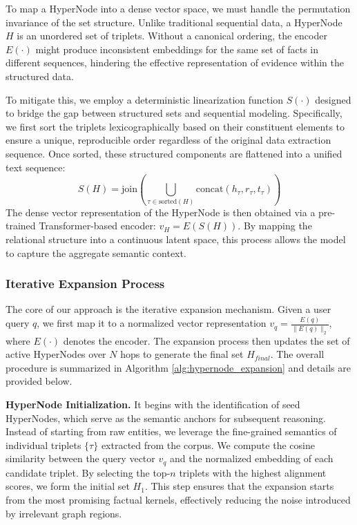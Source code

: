 To map a HyperNode into a dense vector space, we must handle the permutation invariance of the set structure. Unlike traditional sequential data, a HyperNode $H$ is an unordered set of triplets. Without a canonical ordering, the encoder $E(\cdot)$ might produce inconsistent embeddings for the same set of facts  in different sequences, hindering the effective representation of evidence within the structured data.

To mitigate this, we employ a deterministic linearization function $S(\cdot)$ designed to bridge the gap between structured sets and sequential modeling. Specifically, we first sort the triplets lexicographically based on their constituent elements to ensure a unique, reproducible order regardless of the original data extraction sequence. Once sorted, these structured components are flattened into a unified text sequence:
\begin{equation}
    S(H) = \text{join}\left( \bigcup_{\tau \in \text{sorted}(H)} \text{concat}(h_\tau, r_\tau, t_\tau) \right)
\end{equation}
The dense vector representation of the HyperNode is then obtained via a pre-trained Transformer-based encoder: $v_{H} = E(S(H))$. By mapping the relational structure into a continuous latent space, this process allows the model to capture the aggregate semantic context. 

\subsubsection{Iterative Expansion Process}
The core of our approach is the iterative expansion mechanism. Given a user query $q$, we first map it to a normalized vector representation $v_q = \frac{E(q)}{\|E(q)\|_2}$, where $E(\cdot)$ denotes the encoder. The expansion process then updates the set of active HyperNodes over $N$ hops to generate the final set $H_{final}$. The overall procedure is summarized in Algorithm \ref{alg:hypernode_expansion} and details are provided below.


\textbf{HyperNode Initialization.} It begins with the identification of seed HyperNodes, which serve as the semantic anchors for subsequent reasoning. Instead of starting from raw entities, we leverage the fine-grained semantics of individual triplets $\{\tau\}$ extracted from the corpus. We compute the cosine similarity between the query vector $v_q$ and the normalized embedding of each candidate triplet. By selecting the top-$n$ triplets with the highest alignment scores, we form the initial set $H_{1}$. This step ensures that the expansion starts from the most promising factual kernels, effectively reducing the noise introduced by irrelevant graph regions.

